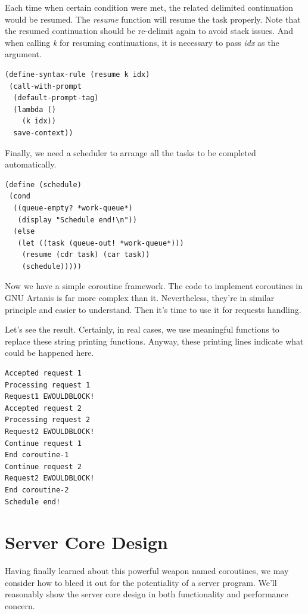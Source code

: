 \documentclass[preprint,numbers,numberedpars,10pt]{sigplanconf}
\begin{document}
Each time when certain condition were met, the related delimited continuation would be resumed. The {\it resume} function will resume the task
properly. Note that the resumed continuation should be re-delimit again to avoid stack issues. And when calling {\it k} for resuming continuations,
it is necessary to pass {\it idx} as the argument.

\begin{lstlisting}
(define-syntax-rule (resume k idx)
 (call-with-prompt
  (default-prompt-tag)
  (lambda ()
    (k idx))
  save-context))
\end{lstlisting}

Finally, we need a scheduler to arrange all the tasks to be completed automatically.

\begin{lstlisting}
(define (schedule)
 (cond
  ((queue-empty? *work-queue*)
   (display "Schedule end!\n"))
  (else
   (let ((task (queue-out! *work-queue*)))
    (resume (cdr task) (car task))
    (schedule)))))
\end{lstlisting}

Now we have a simple coroutine framework. The code to implement coroutines in GNU Artanis is far more complex than it. Nevertheless, they're in
similar principle and easier to understand. Then it's time to use it for requests handling.



Let's see the result. Certainly, in real cases, we use meaningful functions to replace these string printing functions. Anyway, these printing
lines indicate what could be happened here.

\begin{lstlisting}[caption=Coroutines running result]
Accepted request 1
Processing request 1
Request1 EWOULDBLOCK!
Accepted request 2
Processing request 2
Request2 EWOULDBLOCK!
Continue request 1
End coroutine-1
Continue request 2
Request2 EWOULDBLOCK!
End coroutine-2
Schedule end!
\end{lstlisting}

\section{Server Core Design}

Having finally learned about this powerful weapon named coroutines, we may consider how to bleed it out for the potentiality of a server program.
We'll reasonably show the server core design in both functionality and performance concern.
\end{document}
